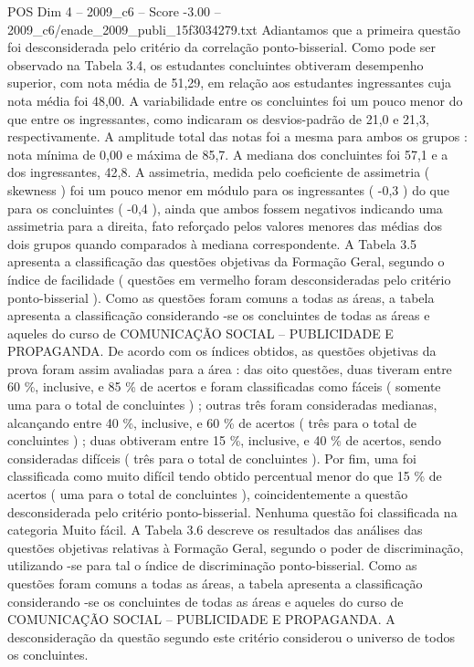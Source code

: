 \begin{textsample}{POS Dim 4 – 2009\_c6 – Score -3.00 – 2009\_c6/enade\_2009\_publi\_15f3034279.txt}
Adiantamos que a primeira questão foi desconsiderada pelo critério da correlação ponto-bisserial.
Como pode ser observado na Tabela 3.4, os estudantes concluintes obtiveram desempenho superior, com nota média de 51,29, em relação aos estudantes ingressantes cuja nota média foi 48,00.
A variabilidade entre os concluintes foi um pouco menor do que entre os ingressantes, como indicaram os desvios-padrão de 21,0 e 21,3, respectivamente.
A amplitude total das notas foi a mesma para ambos os grupos : nota mínima de 0,00 e máxima de 85,7.
A mediana dos concluintes foi 57,1 e a dos ingressantes, 42,8.
A assimetria, medida pelo coeficiente de assimetria ( skewness ) foi um pouco menor em módulo para os ingressantes ( -0,3 ) do que para os concluintes ( -0,4 ), ainda que ambos fossem negativos indicando uma assimetria para a direita, fato reforçado pelos valores menores das médias dos dois grupos quando comparados à mediana correspondente.
A Tabela 3.5 apresenta a classificação das questões objetivas da Formação Geral, segundo o índice de facilidade ( questões em vermelho foram desconsideradas pelo critério ponto-bisserial ).
Como as questões foram comuns a todas as áreas, a tabela apresenta a classificação considerando -se os concluintes de todas as áreas e aqueles do curso de COMUNICAÇÃO SOCIAL – PUBLICIDADE E PROPAGANDA.
De acordo com os índices obtidos, as questões objetivas da prova foram assim avaliadas para a área : das oito questões, duas tiveram entre 60 \%, inclusive, e 85 \% de acertos e foram classificadas como fáceis ( somente uma para o total de concluintes ) ; outras três foram consideradas medianas, alcançando entre 40 \%, inclusive, e 60 \% de acertos ( três para o total de concluintes ) ; duas obtiveram entre 15 \%, inclusive, e 40 \% de acertos, sendo consideradas difíceis ( três para o total de concluintes ).
Por fim, uma foi classificada como muito difícil tendo obtido percentual menor do que 15 \% de acertos ( uma para o total de concluintes ), coincidentemente a questão desconsiderada pelo critério ponto-bisserial.
Nenhuma questão foi classificada na categoria Muito fácil.
A Tabela 3.6 descreve os resultados das análises das questões objetivas relativas à Formação Geral, segundo o poder de discriminação, utilizando -se para tal o índice de discriminação ponto-bisserial.
Como as questões foram comuns a todas as áreas, a tabela apresenta a classificação considerando -se os concluintes de todas as áreas e aqueles do curso de COMUNICAÇÃO SOCIAL – PUBLICIDADE E PROPAGANDA.
A desconsideração da questão segundo este critério considerou o universo de todos os concluintes.

\end{textsample}
